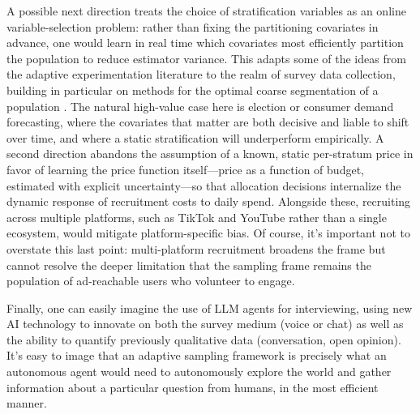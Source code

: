 A possible next direction treats the choice of stratification variables as an online variable-selection problem: rather than fixing the partitioning covariates in advance, one would learn in real time which covariates most efficiently partition the population to reduce estimator variance. This adapts some of the ideas from the adaptive experimentation literature \citep{Kasy2021, Caria2020, Atan2019} to the realm of survey data collection, building in particular on methods for the optimal coarse segmentation of a population \citep{Zhang2022}. The natural high-value case here is election or consumer demand forecasting, where the covariates that matter are both decisive and liable to shift over time, and where a static stratification will underperform empirically. A second direction abandons the assumption of a known, static per-stratum price in favor of learning the price function itself---price as a function of budget, estimated with explicit uncertainty---so that allocation decisions internalize the dynamic response of recruitment costs to daily spend. Alongside these, recruiting across multiple platforms, such as TikTok and YouTube rather than a single ecosystem, would mitigate platform-specific bias. Of course, it's important not to overstate this last point: multi-platform recruitment broadens the frame but cannot resolve the deeper limitation that the sampling frame remains the population of ad-reachable users who volunteer to engage.

Finally, one can easily imagine the use of LLM agents for interviewing, using new AI technology to innovate on both the survey medium (voice or chat) as well as the ability to quantify previously qualitative data (conversation, open opinion). It's easy to image that an adaptive sampling framework is precisely what an autonomous agent would need to autonomously explore the world and gather information about a particular question from humans, in the most efficient manner. 

